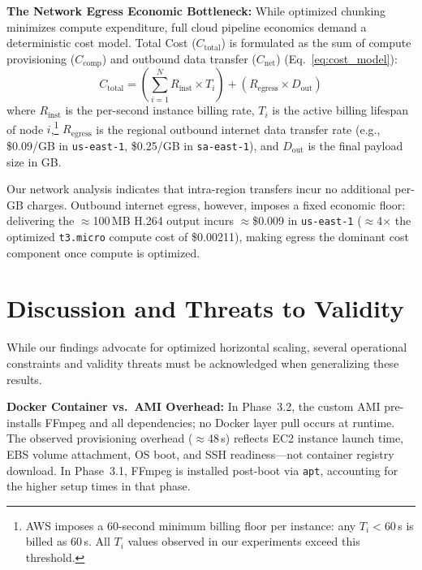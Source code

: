 \documentclass[conference]{IEEEtran}
\begin{document}
\textbf{The Network Egress Economic Bottleneck:}
While optimized chunking minimizes compute expenditure, full cloud pipeline economics demand a deterministic cost model. Total Cost ($C_{\text{total}}$) is formulated as the sum of compute provisioning ($C_{\text{comp}}$) and outbound data transfer ($C_{\text{net}}$) (Eq.~\ref{eq:cost_model}):
\begin{equation}
\label{eq:cost_model}
C_{\text{total}} = \left( \sum_{i=1}^{N} R_{\text{inst}} \times T_{i} \right) + \left( R_{\text{egress}} \times D_{\text{out}} \right)
\end{equation}
where $R_{\text{inst}}$ is the per-second instance billing rate, $T_i$ is the active billing lifespan of node $i$,\footnote{AWS imposes a 60-second minimum billing floor per instance: any $T_i < 60$\,s is billed as 60\,s. All $T_i$ values observed in our experiments exceed this threshold.} $R_{\text{egress}}$ is the regional outbound internet data transfer rate (e.g., \$0.09/GB in \texttt{us-east-1}, \$0.25/GB in \texttt{sa-east-1}), and $D_{\text{out}}$ is the final payload size in GB.

Our network analysis indicates that intra-region transfers incur no additional per-GB charges. Outbound internet egress, however, imposes a fixed economic floor: delivering the $\approx$100\,MB H.264 output incurs $\approx$\$0.009 in \texttt{us-east-1} ($\approx$4$\times$ the optimized \texttt{t3.micro} compute cost of \$0.00211), making egress the dominant cost component once compute is optimized.

\section{Discussion and Threats to Validity}
\label{limitations}

While our findings advocate for optimized horizontal scaling, several operational constraints and validity threats must be acknowledged when generalizing these results.

\textbf{Docker Container vs.\ AMI Overhead:} In Phase~3.2, the custom AMI pre-installs FFmpeg and all dependencies; no Docker layer pull occurs at runtime. The observed provisioning overhead ($\approx$48\,s) reflects EC2 instance launch time, EBS volume attachment, OS boot, and SSH readiness---not container registry download. In Phase~3.1, FFmpeg is installed post-boot via \texttt{apt}, accounting for the higher setup times in that phase.
\end{document}
